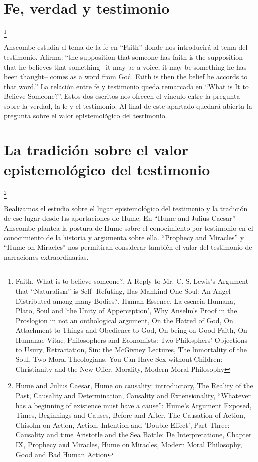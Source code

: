 \documentclass[../main.tex]{subfiles}
\begin{document}
\section{Fe, verdad y testimonio}
\footnote{
Faith, 
What is to believe someone?, 
A Reply to Mr. C. S. Lewis's Argument that “Naturalism” is Self- Refuting, 
Has Mankind One Soul: An Angel Distributed among many Bodies?, 
Human Essence, 
La esencia Humana, 
Plato, Soul and 'the Unity of Apperception', 
Why Anselm's Proof in the Proslogion in not an onthological argument, 
On the Hatred of God, 
On Attachment to Things and Obedience to God, 
On being on Good Faith, 
On Humanae Vitae, 
Philosophers and Economists: Two Philosphers' Objections to Usury, 
Retractation, 
Sin: the McGivney Lectures, 
The Inmortality of the Soul, 
Two Moral Theologians, 
You Can Have Sex without Children: Christianity and the New Offer, 
Morality, 
Modern Moral Philosophy
}

Anscombe estudia el tema de la fe en ``Faith'' donde nos introducirá al tema del testimonio. Afirma: ``the supposition that someone has faith is the supposition that he believes that something --it may be a voice, it may be something he has been thaught-- comes as a word from God. Faith is then the belief he accords to that word.'' La relación entre fe y testimonio queda remarcada en ``What is It to Believe Someone?''. Estos dos escritos nos ofrecen el vínculo entre la pregunta sobre la verdad, la fe y el testimonio. Al final de este apartado quedará abierta la pregunta sobre el valor epistemológico del testimonio.

\section{La tradición sobre el valor epistemológico del testimonio}
\footnote{
Hume and Julius Caesar, 
Hume on causality: introductory, 
The Reality of the Past, 
Causality and Determination, 
Causality and Extensionality, 
“Whatever has a beginning of existence must have a cause”: Hume's Argument Exposed, 
Times, Beginnings and Causes, 
Before and After, 
The Causation of Action, 
Chisolm on Action, 
Action, Intention and 'Double Effect', 
Part Three: Causality and time
Aristotle and the Sea Battle: De Interpretatione, Chapter IX, 
Prophecy and Miracles, 
Hume on Miracles, 
Modern Moral Philosophy, 
Good and Bad Human Action
}

Realizamos el estudio sobre el lugar epistemológico del testimonio y la tradición de ese lugar desde las aportaciones de Hume. En ``Hume and Julius Caesar'' Anscombe plantea la postura de Hume sobre el conocimiento por testimonio en el conocimiento de la historia y argumenta sobre ella. ``Prophecy and Miracles'' y ``Hume on Miracles'' nos permitiran considerar también el valor del testimonio de narraciones extraordinarias. 
\end{document}
